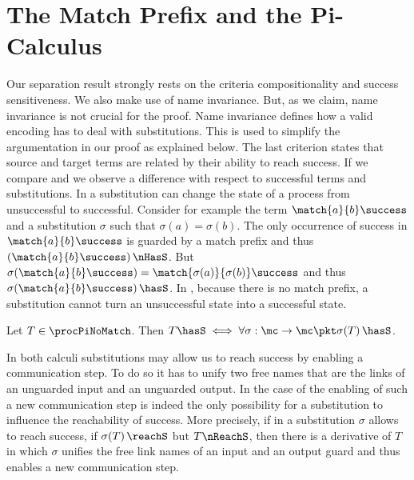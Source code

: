 \documentclass[final,copyright,creativecommons]{eptcs}
\begin{document}
\section{The Match Prefix and the Pi-Calculus}
\label{sec:encodeMatch}

Our separation result strongly rests on the criteria compositionality and success sensitiveness.
We also make use of name invariance.
But, as we claim, name invariance is not crucial for the proof. Name invariance defines how a valid encoding has to deal with substitutions. This is used to simplify the argumentation in our proof as explained below.
The last criterion states that source and target terms are related by their ability to reach success.
If we compare \piT and \piNM we observe a difference with respect to successful terms and substitutions.
In \piT a substitution can change the state of a process from unsuccessful to successful. Consider for example the term $ \match{a}{b}\success $ and a substitution $ \sigma $ such that $ \sigma(a) = \sigma(b) $. The only occurrence of success in $ \match{a}{b}\success $ is guarded by a match prefix and thus $ \left( \match{a}{b}\success \right) \nHasS $. But $ \sigma\!\left( \match{a}{b}\success \right) = \match{\sigma(a)}{\sigma(b)}\success $ and thus $ \sigma\!\left( \match{a}{b}\success \right) \hasS $.
In \piNM, because there is no match prefix, a substitution cannot turn an unsuccessful state into a successful state.

\begin{lemma}
	\label{prop:propequiv}
	Let $ T \in \procPiNoMatch $. Then $ T \hasS \iff \forall \sigma : \mc \to \mc \pkt \sigma\!\left( T \right) \hasS $.
\end{lemma}

In both calculi substitutions may allow us to reach success by enabling a communication step. To do so it has to unify two free names that are the links of an unguarded input and an unguarded output. In the case of \piNM the enabling of such a new communication step is indeed the only possibility for a substitution to influence the reachability of success.
More precisely, if in \piNM a substitution $ \sigma $ allows to reach success, \ie if $ \sigma\!\left( T \right) \reachS $ but $ T \nReachS $, then there is a derivative of $ T $ in which $ \sigma $ unifies the free link names of an input and an output guard and thus enables a new communication step.
\end{document}

